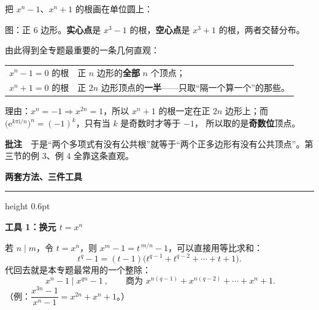\documentclass[11pt,a4paper,fontset=windows]{ctexart}
\newcommand{\sect}[1]{\Needspace{12\baselineskip}\par\vspace{16pt}%
  {\large\bfseries\songti #1}\par\vspace{3pt}\hrule height 0.6pt\par\vspace{8pt}}
\newcommand{\usub}[1]{\Needspace{6\baselineskip}\par\vspace{10pt}%
  {\normalsize\bfseries\songti #1}\par\vspace{2pt}}
\newcommand{\uann}[1]{\par\vspace{3pt}\noindent
  {\small\color{hdgray}\songti\textbf{批注}\ \ #1}\par\vspace{1pt}}
\begin{document}
把 $x^{n}-1$、$x^{n}+1$ 的根画在单位圆上：

\begin{center}
\end{center}

\centerline{\small\songti 图：正 $6$ 边形。\textbf{实心点}是 $x^{3}-1$ 的根，\textbf{空心点}是 $x^{3}+1$ 的根，两者交替分布。}

\smallskip
由此得到全专题最重要的一条几何直观：

\begin{center}
\renewcommand{\arraystretch}{1.45}
\begin{tabular}{@{}l l@{}}
$x^{n}-1=0$ 的根 & 正 $n$ 边形的\textbf{全部} $n$ 个顶点；\\[2pt]
$x^{n}+1=0$ 的根 & 正 $2n$ 边形顶点的\textbf{一半}——只取“隔一个算一个”的那些。\\[2pt]
\end{tabular}
\end{center}
理由：$x^{n}=-1\Rightarrow x^{2n}=1$，所以 $x^{n}+1$ 的根一定在正 $2n$ 边形上；而
$\bigl(\mathrm{e}^{k\pi\mathrm{i}/n}\bigr)^{n}=(-1)^{k}$，只有当 $k$ 是奇数时才等于 $-1$，
所以取的是\textbf{奇数位}顶点。

\uann{于是“两个多项式有没有公共根”就等于“两个正多边形有没有公共顶点”。第三节的例 3、例 4 全靠这条直观。}

\sect{2\quad 两套方法、三件工具}

\usub{工具 1：换元 $t=x^{n}$}

若 $n\mid m$，令 $t=x^{n}$，则 $x^{m}-1=t^{\,m/n}-1$，可以直接用等比求和：
\[
t^{q}-1=(t-1)\bigl(t^{q-1}+t^{q-2}+\cdots+t+1\bigr).
\]
代回去就是本专题最常用的一个整除：
\[
\boxed{\ x^{n}-1\mid x^{qn}-1\ },\qquad\text{商为 }x^{n(q-1)}+x^{n(q-2)}+\cdots+x^{n}+1 .
\]
（例：$\dfrac{x^{3n}-1}{x^{n}-1}=x^{2n}+x^{n}+1$。）
\end{document}
